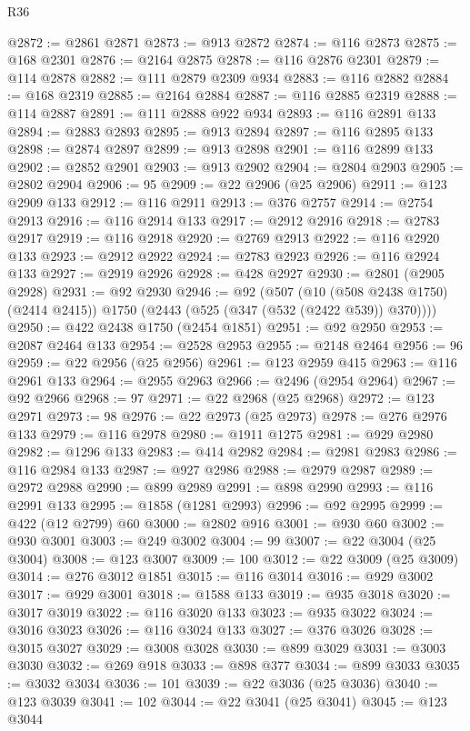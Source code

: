 \begin{lexlean}{R36}
\begin{coremodule}
@2872 := @2861 @2871
@2873 := @913 @2872
@2874 := @116 @2873
@2875 := @168 @2301
@2876 := @2164 @2875
@2878 := @116 @2876 @2301
@2879 := @114 @2878
@2882 := @111 @2879 @2309 @934
@2883 := @116 @2882
@2884 := @168 @2319
@2885 := @2164 @2884
@2887 := @116 @2885 @2319
@2888 := @114 @2887
@2891 := @111 @2888 @922 @934
@2893 := @116 @2891 @133
@2894 := @2883 @2893
@2895 := @913 @2894
@2897 := @116 @2895 @133
@2898 := @2874 @2897
@2899 := @913 @2898
@2901 := @116 @2899 @133
@2902 := @2852 @2901
@2903 := @913 @2902
@2904 := @2804 @2903
@2905 := @2802 @2904
@2906 := 95
@2909 := @22 @2906 (@25 @2906)
@2911 := @123 @2909 @133
@2912 := @116 @2911
@2913 := @376 @2757
@2914 := @2754 @2913
@2916 := @116 @2914 @133
@2917 := @2912 @2916
@2918 := @2783 @2917
@2919 := @116 @2918
@2920 := @2769 @2913
@2922 := @116 @2920 @133
@2923 := @2912 @2922
@2924 := @2783 @2923
@2926 := @116 @2924 @133
@2927 := @2919 @2926
@2928 := @428 @2927
@2930 := @2801 (@2905 @2928)
@2931 := @92 @2930
@2946 := @92
    (@507
      (@10 (@508 @2438 @1750) (@2414 @2415))
      @1750
      (@2443 (@525 (@347 (@532 (@2422 @539)) @370))))
@2950 := @422 @2438 @1750 (@2454 @1851)
@2951 := @92 @2950
@2953 := @2087 @2464 @133
@2954 := @2528 @2953
@2955 := @2148 @2464
@2956 := 96
@2959 := @22 @2956 (@25 @2956)
@2961 := @123 @2959 @415
@2963 := @116 @2961 @133
@2964 := @2955 @2963
@2966 := @2496 (@2954 @2964)
@2967 := @92 @2966
@2968 := 97
@2971 := @22 @2968 (@25 @2968)
@2972 := @123 @2971
@2973 := 98
@2976 := @22 @2973 (@25 @2973)
@2978 := @276 @2976 @133
@2979 := @116 @2978
@2980 := @1911 @1275
@2981 := @929 @2980
@2982 := @1296 @133
@2983 := @414 @2982
@2984 := @2981 @2983
@2986 := @116 @2984 @133
@2987 := @927 @2986
@2988 := @2979 @2987
@2989 := @2972 @2988
@2990 := @899 @2989
@2991 := @898 @2990
@2993 := @116 @2991 @133
@2995 := @1858 (@1281 @2993)
@2996 := @92 @2995
@2999 := @422 (@12 @2799) @60
@3000 := @2802 @916
@3001 := @930 @60
@3002 := @930 @3001
@3003 := @249 @3002
@3004 := 99
@3007 := @22 @3004 (@25 @3004)
@3008 := @123 @3007
@3009 := 100
@3012 := @22 @3009 (@25 @3009)
@3014 := @276 @3012 @1851
@3015 := @116 @3014
@3016 := @929 @3002
@3017 := @929 @3001
@3018 := @1588 @133
@3019 := @935 @3018
@3020 := @3017 @3019
@3022 := @116 @3020 @133
@3023 := @935 @3022
@3024 := @3016 @3023
@3026 := @116 @3024 @133
@3027 := @376 @3026
@3028 := @3015 @3027
@3029 := @3008 @3028
@3030 := @899 @3029
@3031 := @3003 @3030
@3032 := @269 @918
@3033 := @898 @377
@3034 := @899 @3033
@3035 := @3032 @3034
@3036 := 101
@3039 := @22 @3036 (@25 @3036)
@3040 := @123 @3039
@3041 := 102
@3044 := @22 @3041 (@25 @3041)
@3045 := @123 @3044

\end{coremodule}
\end{lexlean}
